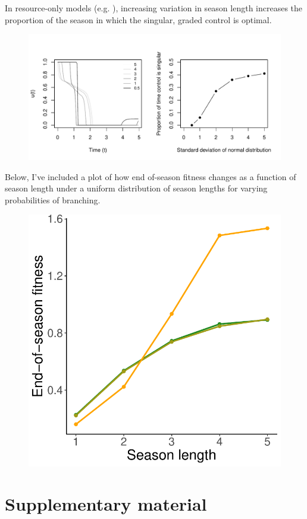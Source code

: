 \documentclass[12pt, oneside,titlepage]{article}   	%
\begin{document}
In resource-only models (e.g. \cite{king1982a}), increasing variation in season length increases the proportion of the season in which the singular, graded control is optimal.

 \begin{figure}[!h]
       \includegraphics[page=1,width=.75\textwidth]{../figures/kingRoughgardenNormalSummary.pdf}  
\end{figure}

Below, I've included a plot of how end of-season fitness changes as a function of season length under a uniform distribution of season lengths for varying probabilities of branching. 

 \begin{figure}[!h]
       \includegraphics[page=1,width=.3\textwidth]{../figures/season.pdf}  
\end{figure}


\clearpage
 
%


\clearpage
\section*{Supplementary material}
\end{document}
